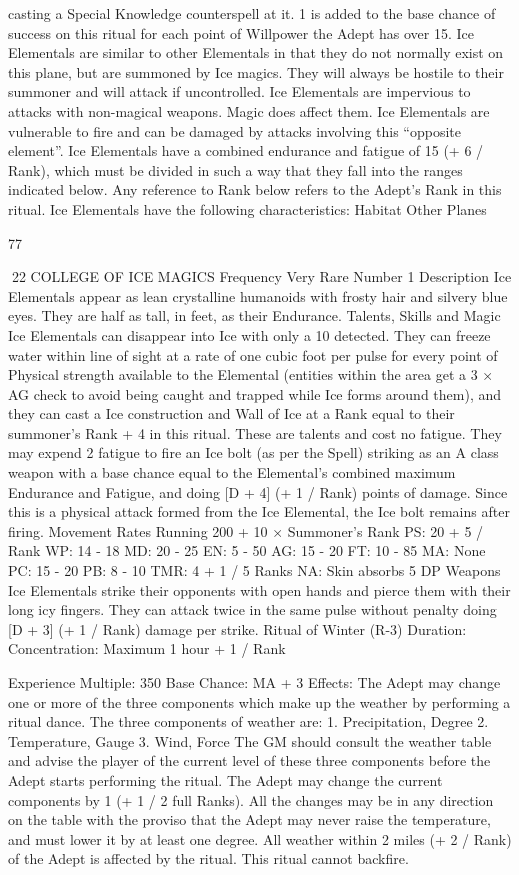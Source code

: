 \documentclass[a4paper]{article}
\begin{document}
\begin{multicols}{3}
casting a Special Knowledge counterspell at it. 1%
is added to the base chance of success on this ritual
for each point of Willpower the Adept has over 15.
Ice Elementals are similar to other Elementals in
that they do not normally exist on this plane, but
are summoned by Ice magics. They will always be
hostile to their summoner and will attack if uncontrolled. Ice Elementals are impervious to attacks
with non-magical weapons. Magic does affect
them. Ice Elementals are vulnerable to fire and can
be damaged by attacks involving this “opposite
element”. Ice Elementals have a combined endurance and fatigue of 15 (+ 6 / Rank), which must be
divided in such a way that they fall into the ranges
indicated below. Any reference to Rank below
refers to the Adept’s Rank in this ritual.
Ice Elementals have the following characteristics:
Habitat Other Planes

77

22 COLLEGE OF ICE MAGICS
Frequency Very Rare
Number 1
Description Ice Elementals appear as lean crystalline humanoids with frosty hair and silvery blue
eyes. They are half as tall, in feet, as their Endurance.
Talents, Skills and Magic Ice Elementals can
disappear into Ice with only a 10%
detected. They can freeze water within line of sight
at a rate of one cubic foot per pulse for every point
of Physical strength available to the Elemental
(entities within the area get a 3 × AG check to
avoid being caught and trapped while Ice forms
around them), and they can cast a Ice construction
and Wall of Ice at a Rank equal to their summoner’s Rank + 4 in this ritual. These are talents
and cost no fatigue. They may expend 2 fatigue to
fire an Ice bolt (as per the Spell) striking as an A
class weapon with a base chance equal to the Elemental’s combined maximum Endurance and Fatigue, and doing [D + 4] (+ 1 / Rank) points of
damage. Since this is a physical attack formed
from the Ice Elemental, the Ice bolt remains after
firing.
Movement Rates Running 200 + 10 × Summoner’s Rank
PS: 20 + 5 / Rank WP: 14 - 18
MD: 20 - 25
EN: 5 - 50
AG: 15 - 20
FT: 10 - 85
MA: None
PC: 15 - 20
PB: 8 - 10
TMR: 4 + 1 / 5 Ranks
NA: Skin absorbs 5 DP
Weapons Ice Elementals strike their opponents
with open hands and pierce them with their long
icy fingers. They can attack twice in the same pulse
without penalty doing [D + 3] (+ 1 / Rank) damage
per strike.
Ritual of Winter (R-3)
Duration: Concentration: Maximum 1 hour + 1 /
Rank

Experience Multiple: 350
Base Chance: MA + 3%
Effects: The Adept may change one or more of the
three components which make up the weather by
performing a ritual dance. The three components of
weather are:
1. Precipitation, Degree
2. Temperature, Gauge
3. Wind, Force
The GM should consult the weather table and
advise the player of the current level of these three
components before the Adept starts performing the
ritual. The Adept may change the current components by 1 (+ 1 / 2 full Ranks). All the changes
may be in any direction on the table with the proviso that the Adept may never raise the temperature, and must lower it by at least one degree. All
weather within 2 miles (+ 2 / Rank) of the Adept is
affected by the ritual. This ritual cannot backfire.


\end{multicols}
\end{document}
